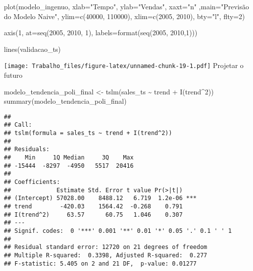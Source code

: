 \documentclass[
]{article}
\newenvironment{Shaded}{\begin{snugshade}}{\end{snugshade}}
\newcommand{\AttributeTok}[1]{\textcolor[rgb]{0.77,0.63,0.00}{#1}}
\newcommand{\DecValTok}[1]{\textcolor[rgb]{0.00,0.00,0.81}{#1}}
\newcommand{\FunctionTok}[1]{\textcolor[rgb]{0.00,0.00,0.00}{#1}}
\newcommand{\NormalTok}[1]{#1}
\newcommand{\OtherTok}[1]{\textcolor[rgb]{0.56,0.35,0.01}{#1}}
\newcommand{\SpecialCharTok}[1]{\textcolor[rgb]{0.00,0.00,0.00}{#1}}
\newcommand{\StringTok}[1]{\textcolor[rgb]{0.31,0.60,0.02}{#1}}
\begin{document}
\begin{Shaded}
\begin{Highlighting}[]
\FunctionTok{plot}\NormalTok{(modelo\_ingenuo, }\AttributeTok{xlab=}\StringTok{"Tempo"}\NormalTok{, }\AttributeTok{ylab=}\StringTok{"Vendas"}\NormalTok{, }\AttributeTok{xaxt=}\StringTok{"n"}\NormalTok{ ,}\AttributeTok{main=}\StringTok{"Previsão do Modelo Naive"}\NormalTok{,  }\AttributeTok{ylim=}\FunctionTok{c}\NormalTok{(}\DecValTok{40000}\NormalTok{, }\DecValTok{110000}\NormalTok{), }\AttributeTok{xlim=}\FunctionTok{c}\NormalTok{(}\DecValTok{2005}\NormalTok{, }\DecValTok{2010}\NormalTok{), }\AttributeTok{bty=}\StringTok{"l"}\NormalTok{, }\AttributeTok{flty=}\DecValTok{2}\NormalTok{)}

\FunctionTok{axis}\NormalTok{(}\DecValTok{1}\NormalTok{, }\AttributeTok{at=}\FunctionTok{seq}\NormalTok{(}\DecValTok{2005}\NormalTok{, }\DecValTok{2010}\NormalTok{, }\DecValTok{1}\NormalTok{), }\AttributeTok{labels=}\FunctionTok{format}\NormalTok{(}\FunctionTok{seq}\NormalTok{(}\DecValTok{2005}\NormalTok{, }\DecValTok{2010}\NormalTok{,}\DecValTok{1}\NormalTok{)))}

\FunctionTok{lines}\NormalTok{(validacao\_ts)}
\end{Highlighting}
\end{Shaded}

\texttt{[image: Trabalho\_files/figure-latex/unnamed-chunk-19-1.pdf]}
Projetar o futuro

\begin{Shaded}
\begin{Highlighting}[]
\NormalTok{modelo\_tendencia\_poli\_final }\OtherTok{\textless{}{-}} \FunctionTok{tslm}\NormalTok{(sales\_ts }\SpecialCharTok{\textasciitilde{}}\NormalTok{ trend }\SpecialCharTok{+} \FunctionTok{I}\NormalTok{(trend}\SpecialCharTok{\^{}}\DecValTok{2}\NormalTok{))}
\FunctionTok{summary}\NormalTok{(modelo\_tendencia\_poli\_final)}
\end{Highlighting}
\end{Shaded}

\begin{verbatim}
## 
## Call:
## tslm(formula = sales_ts ~ trend + I(trend^2))
## 
## Residuals:
##    Min     1Q Median     3Q    Max 
## -15444  -8297  -4950   5517  20416 
## 
## Coefficients:
##             Estimate Std. Error t value Pr(>|t|)    
## (Intercept) 57028.00    8488.12   6.719  1.2e-06 ***
## trend        -420.03    1564.42  -0.268    0.791    
## I(trend^2)     63.57      60.75   1.046    0.307    
## ---
## Signif. codes:  0 '***' 0.001 '**' 0.01 '*' 0.05 '.' 0.1 ' ' 1
## 
## Residual standard error: 12720 on 21 degrees of freedom
## Multiple R-squared:  0.3398, Adjusted R-squared:  0.277 
## F-statistic: 5.405 on 2 and 21 DF,  p-value: 0.01277
\end{verbatim}
\end{document}
